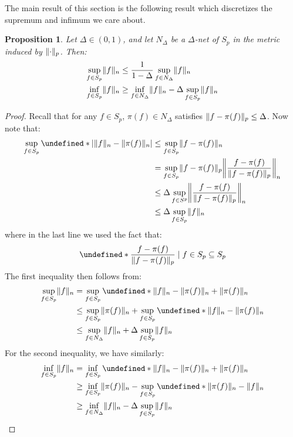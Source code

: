 \documentclass{article}
\theoremstyle{plain}
\newtheorem{proposition}[lemma]{Proposition} %
\theoremstyle{definition}
\theoremstyle{remark}
\let\brace\undefined
\DeclarePairedDelimiter{\brace}{\lbrace}{\rbrace}
\DeclarePairedDelimiter{\abs}{\lvert}{\rvert}
\DeclarePairedDelimiter{\norm}{\lVert}{\rVert}
\begin{document}
The main result of this section is the following result which discretizes the supremum and infimum we care about.
\begin{proposition}
\label{prop:1}
    Let $\Delta \in (0, 1)$, and let $N_{\Delta}$ be a $\Delta$-net of $S_p$ in the metric induced by $\norm{\cdot}_p$. Then:
    \begin{align*}
        \sup_{f \in S_p} \norm{f}_n &\leq \frac{1}{1-\Delta} \sup_{f \in N_{\Delta}} \norm{f}_n \\
        \inf_{f \in S_p} \norm{f}_n & \geq \inf_{f \in N_{\Delta}} \norm{f}_n - \Delta \sup_{f \in S_p} \norm{f}_n 
    \end{align*}
\end{proposition}
\begin{proof}
    Recall that for any $f \in S_p$, $\pi(f) \in N_{\Delta}$ satisfies $\norm{f - \pi(f)}_p \leq \Delta$. Now note that:
    \begin{align*}
        \sup_{f \in S_p} \brace*{\abs*{\norm{f}_n - \norm{\pi(f)}_n}} &\leq \sup_{f \in S_p} \norm{f - \pi(f)}_n \\
        &= \sup_{f \in S_p} \norm{f - \pi(f)}_p \norm*{\frac{f - \pi(f)}{\norm{f - \pi(f)}_p}}_n \\
        &\leq \Delta \sup_{f \in S^p} \norm*{\frac{f - \pi(f)}{\norm{f - \pi(f)}_p}}_n \\
        &\leq \Delta \sup_{f \in S_p} \norm{f}_n
    \end{align*}
    where in the last line we used the fact that:
    \begin{equation*}
        \brace*{\frac{f - \pi(f)}{\norm{f - \pi(f)}_p} \mid f \in S_p} \subseteq S_p
    \end{equation*}
    The first inequality then follows from:
    \begin{align*}
        \sup_{f \in S_p} \norm{f}_n &= \sup_{f \in S_p} \brace*{\norm{f}_n - \norm{\pi(f)}_n + \norm{\pi(f)}_n} \\
        &\leq \sup_{f \in S_p} \norm{\pi(f)}_n + \sup_{f \in S_p} \brace*{\norm{f}_n - \norm{\pi(f)}_n} \\
        &\leq \sup_{f \in N_{\Delta}} \norm{f}_n + \Delta \sup_{f \in S_p} \norm{f}_n
    \end{align*}
    For the second inequality, we have similarly:
    \begin{align*}
        \inf_{f \in S_p} \norm{f}_n &= \inf_{f \in S_p} \brace*{\norm{f}_n - \norm{\pi(f)}_n + \norm{\pi(f)}_n} \\
        &\geq \inf_{f \in S_p} \norm{\pi(f)}_n - \sup_{f \in S_p} \brace*{\norm{\pi(f)}_n - \norm{f}_n} \\
        &\geq \inf_{f \in N_{\Delta}} \norm{f}_n - \Delta \sup_{f \in S_p} \norm{f}_n
    \end{align*}
\end{proof}
\end{document}
